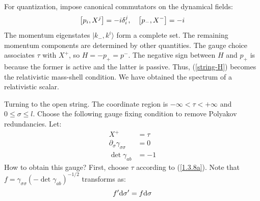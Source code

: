For quantization, impose canonical commutators on the dynamical fields: 
\begin{equation}
	\left[p_{i}, X^{j}\right]=-i \delta_{i}^{j}, \quad\left[p_{-}, X^{-}\right]=-i
\end{equation}
The momentum eigenstates $|k_-, k^i\rangle$ form a complete set. The remaining momentum components are determined by other quantities. The gauge choice associates $\tau$ with $X^+$, so $H=-p_+ =p^-$. The negative sign between $H$ and $p_+$ is because the former is active and the latter is passive. Thus, (\ref{string-H}) becomes the relativistic mass-shell condition. We have obtained the spectrum of a relativistic scalar. 

Turning to the open string. The coordinate region is $-\infty<\tau<+\infty$ and $0\leq \sigma\leq l$. Choose the following gauge fixing condition to remove Polyakov redundancies. Let: 
\begin{subequations} 
	\begin{align} 
		X^+&=\tau \label{1.3.8a} \\
		\partial_{\sigma} \gamma_{\sigma \sigma}&=0 \label{1.3.8b} \\
		\operatorname{det} \gamma_{a b}&=-1 \label{1.3.8c}
	\end{align}   \label{1.3.8}
\end{subequations}
How to obtain this gauge? 
First, choose $\tau$ according to (\ref{1.3.8a}). Note that $f=\gamma_{\sigma \sigma}\left(-\operatorname{det} \gamma_{a b}\right)^{-1 / 2}$ transforms as: 
\begin{equation}
	f^{\prime} \mathrm{d} \sigma^{\prime}=f \mathrm{d} \sigma\label{1.3.9}
\end{equation}
